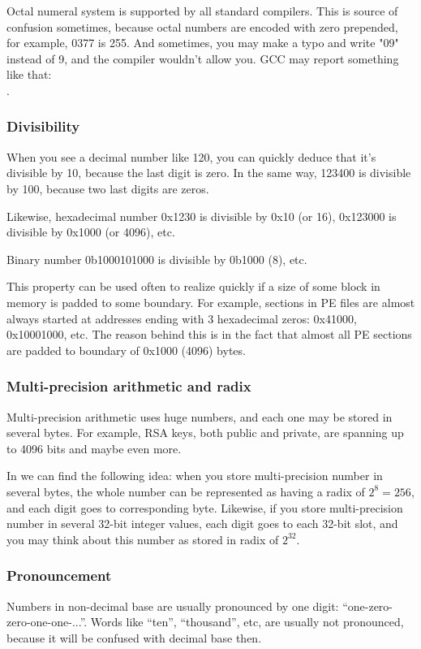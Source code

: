 Octal numeral system is supported by all standard \CCpp compilers.
This is source of confusion sometimes, because octal numbers are encoded with zero prepended, for example, 0377 is 255.
And sometimes, you may make a typo and write "09" instead of 9, and the compiler wouldn't allow you.
GCC may report something like that:\\
.

\subsubsection{Divisibility}

When you see a decimal number like 120, you can quickly deduce that it's divisible by 10, because the last digit is zero.
In the same way, 123400 is divisible by 100, because two last digits are zeros.

Likewise, hexadecimal number 0x1230 is divisible by 0x10 (or 16), 0x123000 is divisible by 0x1000 (or 4096), etc.

Binary number 0b1000101000 is divisible by 0b1000 (8), etc.

This property can be used often to realize quickly if a size of some block in memory is padded to some boundary.
For example, sections in \ac{PE} files are almost always started at addresses ending with 3 hexadecimal zeros: 0x41000, 0x10001000, etc.
The reason behind this is in the fact that almost all \ac{PE} sections are padded to boundary of 0x1000 (4096) bytes.

\subsubsection{Multi-precision arithmetic and radix}

Multi-precision arithmetic uses huge numbers, and each one may be stored in several bytes.
For example, RSA keys, both public and private, are spanning up to 4096 bits and maybe even more.

In  we can find the following idea: when you store multi-precision number in several bytes,
the whole number can be represented as having a radix of $2^8=256$, and each digit goes to corresponding byte.
Likewise, if you store multi-precision number in several 32-bit integer values, each digit goes to each 32-bit slot,
and you may think about this number as stored in radix of $2^{32}$.

\subsubsection{Pronouncement}

Numbers in non-decimal base are usually pronounced by one digit: ``one-zero-zero-one-one-...''.
Words like ``ten'', ``thousand'', etc, are usually not pronounced, because it will be confused with decimal base then.

